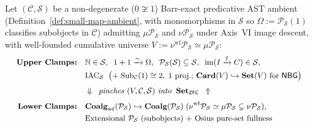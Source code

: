 \begin{theorem}\label{thm:scale-invariance}%
%
Let $(\mathcal{C}, \mathcal{S})$ be a non-degenerate ($0 \not\cong 1$) Barr-exact predicative AST ambient (Definition~\ref{def:small-map-ambient}, with monomorphisms in $\mathcal{S}$ so $\Omega := \mathcal{P}_{\mathcal{S}}(1)$ classifies subobjects in $\mathcal{C}$) admitting $\mu \mathcal{P}_{\mathcal{S}}$ and $\nu \mathcal{P}_{\mathcal{S}}$ under Axis~VI image descent, with well-founded cumulative universe $V := \nu^{\mathrm{wf}} \mathcal{P}_{\mathcal{S}} \simeq \mu \mathcal{P}_{\mathcal{S}}$:
\[
  {\small\begin{aligned}
    \text{\textbf{Upper Clamps:}}\quad &\mathbb{N} \in \mathcal{S},\;\; 1+1 \xrightarrow{\sim} \Omega,\;\; \mathcal{P}_{\mathcal{S}}(\mathcal{S}) \subseteq \mathcal{S},\;\; \mathrm{im}(I \xrightarrow{f} C) \in \mathcal{S}, \\
    &\mathrm{IAC}_{\mathcal{S}}\;\; \bigl(\text{+\;}\mathrm{Sub}_{\mathcal{C}}(1)\cong 2,\; 1\text{ proj.; }\mathbf{Card}(V) \hookrightarrow \mathbf{Set}(V)\text{ for }\mathsf{NBG}\bigr) \\[0.25em]
    &\Downarrow \;\; \text{\emph{pinches $(V, \mathcal{C}, \mathcal{S})$ into}}\;\; \mathbf{Set}_{\mathsf{ZFC}} \;\;\Uparrow \\[0.25em]
    \text{\textbf{Lower Clamps:}}\quad &\mathbf{Coalg}_{\mathrm{wf}}(\mathcal{P}_{\mathcal{S}}) \hookrightarrow \mathbf{Coalg}(\mathcal{P}_{\mathcal{S}})\; (\nu^{\mathrm{wf}}\mathcal{P}_{\mathcal{S}} \simeq \mu\mathcal{P}_{\mathcal{S}} \subsetneq \nu\mathcal{P}_{\mathcal{S}}), \\
    &\text{Extensional }\mathcal{P}_{\mathcal{S}}\text{ (subobjects) + Osius pure-set fullness}
  \end{aligned}}
\]
\begin{enumerate}[label=\textup{(\roman*)},leftmargin=1.8em]

\end{enumerate}
\end{theorem}
